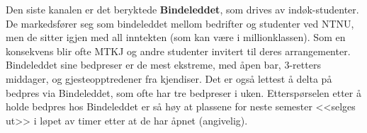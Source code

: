 Den siste kanalen er det beryktede \textbf{Bindeleddet}, som drives av indøk-studenter. De markedsfører seg som bindeleddet mellom bedrifter og studenter ved NTNU, men de sitter igjen med all inntekten (som kan være i millionklassen). Som en konsekvens blir ofte MTKJ og andre studenter invitert til deres arrangementer. Bindeleddet sine bedpreser er de mest ekstreme, med åpen bar, 3-retters middager, og gjesteopptredener fra kjendiser. Det er også lettest å delta på bedpres via Bindeleddet, som ofte har tre bedpreser i uken. Etterspørselen etter å holde bedpres hos Bindeleddet er så høy at plassene for neste semester <<selges ut>> i løpet av timer etter at de har åpnet (angivelig).